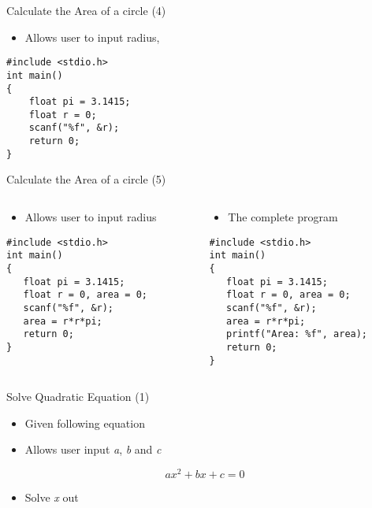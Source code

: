 \begin{frame}[fragile]{Calculate the Area of a circle (4)}
	\begin{itemize}
		\item {Allows user to input radius,}
	\end{itemize}
\begin{center}
	\begin{lstlisting}[frame=non, xleftmargin=0.2\linewidth]
#include <stdio.h>
int main()
{
    float pi = 3.1415;
    float r = 0;
    scanf("%f", &r);
    return 0;
}
	\end{lstlisting}
\end{center}
\end{frame}

\begin{frame}[fragile]{Calculate the Area of a circle (5)}
	\begin{columns}
		\begin{column}{0.5\linewidth}
	\begin{itemize}
		\item {Allows user to input radius}
	\end{itemize}

	\begin{lstlisting}[frame=non, xleftmargin=0.05\linewidth]
#include <stdio.h>
int main()
{
   float pi = 3.1415;
   float r = 0, area = 0;
   scanf("%f", &r);
   area = r*r*pi;
   return 0;
}
  \end{lstlisting}
	\end{column}
		\begin{column}{0.5\linewidth}
	\begin{itemize}
		\item {The complete program}
	\end{itemize}
	\begin{lstlisting}[frame=non]
#include <stdio.h>
int main()
{
   float pi = 3.1415;
   float r = 0, area = 0;
   scanf("%f", &r);
   area = r*r*pi;
   printf("Area: %f", area);
   return 0;
}
  \end{lstlisting}
	\end{column}
\end{columns}
\end{frame}

\begin{frame}[fragile]{Solve Quadratic Equation (1)}
\begin{itemize}
	\item {Given following equation}
	\item {Allows user input \textit{a}, \textit{b} and \textit{c}}
\end{itemize}
\begin{equation}
	ax^2+bx+c=0 \nonumber
\end{equation}
\begin{itemize}
	\item {Solve \textit{x} out}
\end{itemize}
\end{frame}

